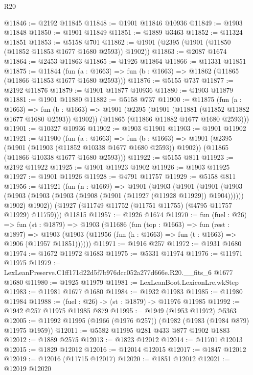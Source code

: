 \begin{lexlean}{R20}
\begin{coremodule}
@11846 := @2192 @11845
@11848 := @1901 @11846 @10936
@11849 := @1903 @11848
@11850 := @1901 @11849
@11851 := @1889 @3463
@11852 := @11324 @11851
@11853 := @5158 @701
@11862 := @1901 (@2395 (@1901 (@11850 (@11852 @11853 @1677 @1680 @2593)) @1902))
@11863 := @2087 @1674
@11864 := @2453 @11863
@11865 := @1926 @11864
@11866 := @11331 @11851
@11875 := @11844
    (fun (a : @1663) => fun (b : @1663) => @11862 (@11865 (@11866 @11853 @1677 @1680 @2593)))
@11876 := @5155 @737
@11877 := @2192 @11876
@11879 := @1901 @11877 @10936
@11880 := @1903 @11879
@11881 := @1901 @11880
@11882 := @5158 @737
@11900 := @11875
    (fun (a : @1663) =>
    fun (b : @1663) =>
    @1901
      (@2395 (@1901 (@11881 (@11852 @11882 @1677 @1680 @2593)) @1902))
      (@11865 (@11866 @11882 @1677 @1680 @2593)))
@11901 := @10327 @10936
@11902 := @1903 @11901
@11903 := @1901 @11902
@11921 := @11900
    (fun (a : @1663) =>
    fun (b : @1663) =>
    @1901
      (@2395 (@1901 (@11903 (@11852 @10338 @1677 @1680 @2593)) @1902))
      (@11865 (@11866 @10338 @1677 @1680 @2593)))
@11922 := @5155 @811
@11923 := @2192 @11922
@11925 := @1901 @11923 @1902
@11926 := @1903 @11925
@11927 := @1901 @11926
@11928 := @4791 @11757
@11929 := @5158 @811
@11956 := @11921
    (fun (n : @1669) =>
    @1901
      (@1903
        (@1901
          (@1901
            (@1903 (@1903 (@1903 (@1903 (@1908 (@1901 (@11927 (@11928 @11929)) @1904))))))
            @1902)
          @1902))
      (@1927 (@11749 @11752 (@11751 @11755) (@4795 @11757 @11929) @11759)))
    @11815
@11957 := @1926 @1674
@11970 := fun (fuel : @26) =>
  fun (st : @1879) =>
  @1903
    (@11686
      (fun (top : @1663) =>
      fun (rest : @1897) =>
      @1903 (@1903 (@11956 (fun (h : @1663) => fun (t : @1663) => @1906 (@11957 @11851))))))
@11971 := @1916 @257
@11972 := @1931 @1680
@11974 := @1672 @11972 @1683
@11975 := @5331 @11974
@11976 := @11971 @11975
@11979 := LexLeanPreserve.C1ff171d22d5f7b976dcc052a277d666e.R20.__fits_6 @1677 @1680
@11980 := @1925 @11979
@11981 := LexLeanBoot.LexiconLre.wkStep
@11983 := @11981 @1677 @1680
@11984 := @1932 @11983
@11985 := @11980 @11984
@11988 := (fuel : @26) -> (st : @1879) -> @11976 @11985
@11992 := @1942 @257 @11975 @11985 @879
@11995 := @1949 (@1953 @11972) @5363
@12005 := @11992 @11995 (@1966 (@1976 @257)) (@1982 (@1983 (@1984 @879) @11975 @1959))
@12011 := @5582 @11995 @281 @433 @877 @1902 @1883
@12012 := @1889 @2575
@12013 := @1823 @12012
@12014 := @11701 @12013
@12015 := @1829 @12012
@12016 := @12014 @12015
@12017 := @1847 @12012
@12019 := @12016 (@11715 @12017)
@12020 := @1851 @12012
@12021 := @12019 @12020

\end{coremodule}
\end{lexlean}
